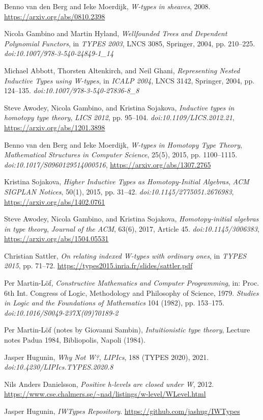 \documentclass{article}
\begin{document}
\begin{thebibliography}{99}
Benno van den Berg and Ieke Moerdijk,
\textit{W-types in sheaves},
2008.
\url{https://arxiv.org/abs/0810.2398}

Nicola Gambino and Martin Hyland,
\textit{Wellfounded Trees and Dependent Polynomial Functors},
in \textit{TYPES 2003}, LNCS 3085, Springer, 2004, pp. 210–225.
\textit{doi:10.1007/978-3-540-24849-1\_14}

Michael Abbott, Thorsten Altenkirch, and Neil Ghani,
\textit{Representing Nested Inductive Types using W-types},
in \textit{ICALP 2004}, LNCS 3142, Springer, 2004, pp. 124–135.
\textit{doi:10.1007/978-3-540-27836-8\_8}

Steve Awodey, Nicola Gambino, and Kristina Sojakova,
\textit{Inductive types in homotopy type theory},
\textit{LICS 2012}, pp. 95–104.
\textit{doi:10.1109/LICS.2012.21},
\url{https://arxiv.org/abs/1201.3898}

Benno van den Berg and Ieke Moerdijk,
\textit{W-types in Homotopy Type Theory},
\textit{Mathematical Structures in Computer Science}, 25(5), 2015, pp. 1100–1115.
\textit{doi:10.1017/S0960129514000516},
\url{https://arxiv.org/abs/1307.2765}

Kristina Sojakova,
\textit{Higher Inductive Types as Homotopy-Initial Algebras},
\textit{ACM SIGPLAN Notices}, 50(1), 2015, pp. 31–42.
\textit{doi:10.1145/2775051.2676983},
\url{https://arxiv.org/abs/1402.0761}

Steve Awodey, Nicola Gambino, and Kristina Sojakova,
\textit{Homotopy-initial algebras in type theory},
\textit{Journal of the ACM}, 63(6), 2017, Article 45.
\textit{doi:10.1145/3006383},
\url{https://arxiv.org/abs/1504.05531}

Christian Sattler,
\textit{On relating indexed W-types with ordinary ones},
in \textit{TYPES 2015}, pp. 71–72.
\url{https://types2015.inria.fr/slides/sattler.pdf}

Per Martin-Löf,
\textit{Constructive Mathematics and Computer Programming},
in: Proc. 6th Int. Congress of Logic, Methodology and Philosophy of Science, 1979. \textit{Studies in Logic and the Foundations of Mathematics} 104 (1982), pp. 153–175.
\textit{doi:10.1016/S0049-237X(09)70189-2}

Per Martin-Löf (notes by Giovanni Sambin),
\textit{Intuitionistic type theory}, Lecture notes Padua 1984, Bibliopolis, Napoli (1984).

Jasper Hugunin,
\textit{Why Not W?},
\textit{LIPIcs}, 188 (TYPES 2020), 2021.
\textit{doi:10.4230/LIPIcs.TYPES.2020.8}

Nils Anders Danielsson,
\textit{Positive h-levels are closed under W},
2012.
\url{https://www.cse.chalmers.se/~nad/listings/w-level/WLevel.html}

Jasper Hugunin,
\textit{IWTypes Repository}.
\url{https://github.com/jashug/IWTypes}

\end{thebibliography}
\end{document}
